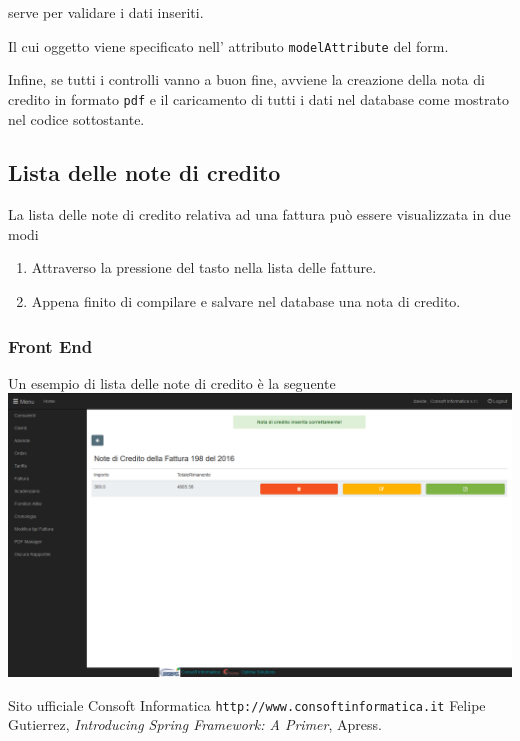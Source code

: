 \documentclass[12pt]{book}
\begin{document}
serve per validare i dati inseriti.

Il cui oggetto viene specificato nell' attributo \texttt{modelAttribute} del 
form.

Infine, se tutti i controlli vanno a buon fine, avviene la creazione della nota di 
credito in formato \texttt{pdf} e il caricamento di tutti i dati nel database
come mostrato nel codice sottostante.
\clearpage

\subsection{Lista delle note di credito}
La lista delle note di credito relativa ad una fattura può essere visualizzata
in due modi
\begin{enumerate}
    \item Attraverso la pressione del tasto
         nella lista delle fatture.
    \item Appena finito di compilare e salvare nel database una nota di credito.
\end{enumerate}
\subsubsection{Front End}
Un esempio di lista delle note di credito è la seguente
\newline
\newline
\includegraphics[scale=0.4]{img/visualizzazione_note_credito}
\newline
\begin{thebibliography}{9}
     Sito ufficiale Consoft Informatica \newline
    \texttt{http://www.consoftinformatica.it}
    Felipe Gutierrez, 
    \emph{Introducing Spring Framework: A Primer}, Apress.
    \newline
\end{thebibliography}
\end{document}
